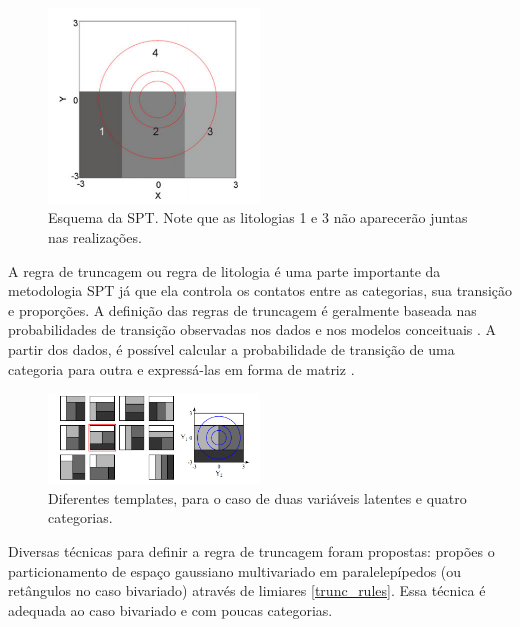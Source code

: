 \begin{figure}[!ht]
	\caption{\label{trunc_pluri}Esquema da SPT. Note que as litologias 1 e 3 não aparecerão juntas nas realizações.}
	\begin{center}
		\includegraphics[width=0.5\textwidth]{capitulo_3/pluri_sketch.png}
	\end{center}
\end{figure}

A regra de truncagem ou regra de litologia é uma parte importante da metodologia SPT já que ela controla os contatos entre as categorias, sua transição e proporções. A definição das regras de truncagem é geralmente baseada nas probabilidades de transição observadas nos dados e nos modelos conceituais \cite{mariethoz2009truncated}. A partir dos dados, é possível calcular a probabilidade de transição de uma categoria para outra e expressá-las em forma de matriz \cite{advances_in_spt}.

\begin{figure}[!ht]
	\caption{\label{trunc_rules}Diferentes templates, para o caso de duas variáveis latentes e quatro categorias.}
	\begin{center}
		\includegraphics[width=0.5\textwidth]{capitulo_3/trunc_rules.png}
	\end{center}
\end{figure}

Diversas técnicas para definir a regra de truncagem foram propostas:  propões o particionamento de espaço gaussiano multivariado em paralelepípedos (ou retângulos no caso bivariado) através de limiares \autoref{trunc_rules}. Essa técnica é adequada ao caso bivariado e com poucas categorias.

